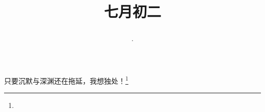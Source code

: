 \title{\date[d=5,m=8,y=2024][year:cn-y,年,month:cn,day:cn,日,·,weekday]·七月初二 }
只要沉默与深渊还在拖延，我想独处！\footnote{ }

